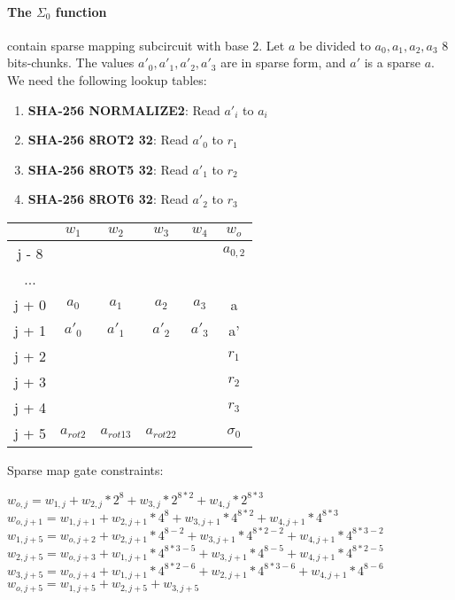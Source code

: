 \paragraph{The $\Sigma_0$ function}
contain sparse mapping subcircuit with base $2$.
Let $a$ be divided to $a_0, a_1, a_2, a_3$ 8 bits-chunks.
The values $a'_0, a'_1, a'_2, a'_3$ are in sparse form, and $a'$ is a sparse $a$.
We need the following lookup tables:
\begin{enumerate}
\item \textbf{SHA-256 NORMALIZE2}: Read $a'_i$ to $a_i$
\item \textbf{SHA-256 8ROT2 32}: Read $a'_0$ to $r_1$
\item \textbf{SHA-256 8ROT5 32}: Read $a'_1$ to $r_2$
\item \textbf{SHA-256 8ROT6 32}: Read $a'_2$ to $r_3$
\end{enumerate}
\begin{center}
\begin{tabular}{ |c|c|c|c|c|c } 
  & $w_1$ & $w_2$ & $w_3$ & $w_4$ & $w_o$\\ 
 \hline
j - 8 &  &  &  &  & $a_{0, 2}$\\ 
... &&&&& \\
j + 0 & $a_0$ & $ a_1$ & $a_2$ & $a_3$ & a\\ 
j + 1 & $a'_0$ & $a'_1$ & $a'_2$ & $a'_3$ & a' \\ 
j + 2 & &  &  &  & $r_1$ \\
j + 3 & &  &  &  & $r_2 $ \\ 
j + 4 & &  &  &  & $r_3 $ \\ 
j + 5 & $a_{rot2} $& $a_{rot13}$ & $a_{rot22}$ &  & $\sigma_0$ \\ 
 \hline
\end{tabular}
\end{center}
Sparse map gate constraints:
\begin{center}
$w_{o,j} = w_{1,j} + w_{2,j}*2^8 + w_{3,j}*2^{8*2} + w_{4,j}*2^{8*3}$ \\
$w_{o,j+1} = w_{1,j+1} + w_{2,j+1}*4^8 + w_{3,j+1}*4^{8*2} + w_{4,j+1}*4^{8*3}$ \\
$w_{1,j+5} = w_{o,j+2} + w_{2,j+1}*4^{8-2} + w_{3,j+1}*4^{8*2-2} + w_{4,j+1}*4^{8*3 - 2}$ \\
$w_{2,j+5} = w_{o,j+3} + w_{1,j+1}*4^{8*3-5} + w_{3,j+1}*4^{8-5} + w_{4,j+1}*4^{8*2 - 5}$ \\
$w_{3,j+5} = w_{o,j+4} + w_{1,j+1}*4^{8*2-6} + w_{2,j+1}*4^{8*3-6} + w_{4,j+1}*4^{8 - 6}$ \\
$w_{o, j+5} = w_{1,j+5} + w_{2, j+5} + w_{3, j+5}$ \\
\end{center}

